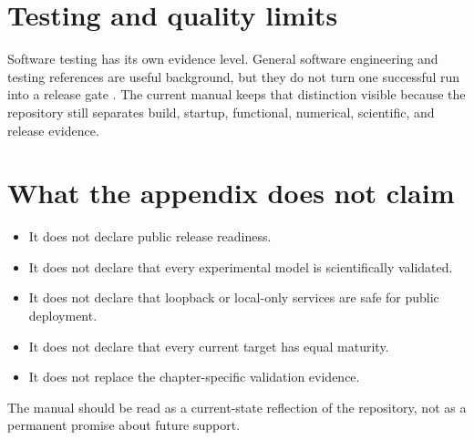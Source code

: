 \section{Testing and quality limits}

Software testing has its own evidence level. General software engineering and
testing references are useful background, but they do not turn one successful
run into a release gate \cite{sommerville2015,myers2011}. The current manual
keeps that distinction visible because the repository still separates build,
startup, functional, numerical, scientific, and release evidence.

\section{What the appendix does not claim}

\begin{itemize}
\item It does not declare public release readiness.
\item It does not declare that every experimental model is scientifically
  validated.
\item It does not declare that loopback or local-only services are safe for
  public deployment.
\item It does not declare that every current target has equal maturity.
\item It does not replace the chapter-specific validation evidence.
\end{itemize}

The manual should be read as a current-state reflection of the repository, not
as a permanent promise about future support.
